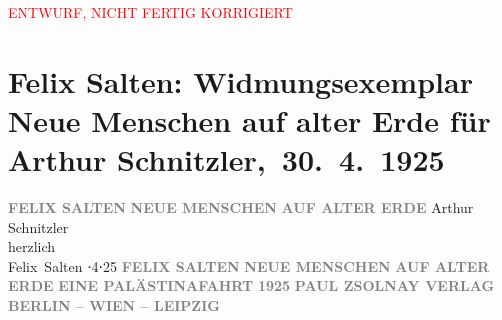 
\begin{center}
            \textcolor{red}{ENTWURF, NICHT FERTIG KORRIGIERT}
                      \end{center}
            
         \renewcommand{\erwaehnteInstitutionen}{Institutionen: Paul Zsolnay Verlag}
         \renewcommand{\erwaehnteOrte}{Orte: Berlin, Leipzig, Wien}
         \renewcommand{\erwaehnteWerke}{}
               \section[ Felix Salten: Widmungsexemplar Neue Menschen auf alter Erde für Arthur Schnitzler, 30. 4. 1925]{ Felix Salten: Widmungsexemplar Neue Menschen auf alter Erde für Arthur
               Schnitzler, 30. 4. 1925}\nopagebreak{}\rehead{ }\begin{ledgroupsized}[t]{13cm}\normalsize\beginnumbering \toendnotes[C]{\smallbreak\pagebreak[2]} 
\pstart
           \noindent{}\centering{}{\pb}\textcolor{gray}{\textbf{FELIX SALTEN}}\pend
           \pstart
           \noindent{}\centering{}\textcolor{gray}{\textbf{NEUE MENSCHEN}}\pend
           \pstart
           \noindent{}\centering{}\textcolor{gray}{\textbf{AUF ALTER ERDE}}\pend
           {\bigskip}\pstart
           \noindent{}Arthur Schnitzler {\\}herzlich{\\}\spacefill\mbox{Felix Salten}\pend
           ⋅4⋅25\pend
           {\bigskip}\pstart
           \noindent{}\centering{}{\pb}\textcolor{gray}{\textbf{FELIX SALTEN}}\pend
           \pstart
           \noindent{}\centering{}\textcolor{gray}{\textbf{NEUE MENSCHEN}}\pend
           \pstart
           \noindent{}\centering{}\textcolor{gray}{\textbf{AUF ALTER ERDE}}\pend
           {\bigskip}\pstart
           \noindent{}\centering{}\textcolor{gray}{\textbf{EINE PALÄSTINAFAHRT}}\pend
           {\bigskip}\pstart
           \noindent{}\centering{}\textcolor{gray}{\textbf{1925}}\pend
           \pstart
           \noindent{}\centering{}\textcolor{gray}{\textbf{PAUL ZSOLNAY VERLAG}}\pend
           \pstart
           \noindent{}\centering{}\textcolor{gray}{\textbf{BERLIN – WIEN – LEIPZIG}}\pend
           
         
         \endnumbering{}\end{ledgroupsized}  \newcommand{\dateiname}{L03045}\newcommand{\titel}{Felix Salten: Widmungsexemplar Neue Menschen auf alter Erde für Arthur Schnitzler, 30. 4. 1925}\newcommand{\editorInnen}{Martin Anton Müller und Laura Untner}
      